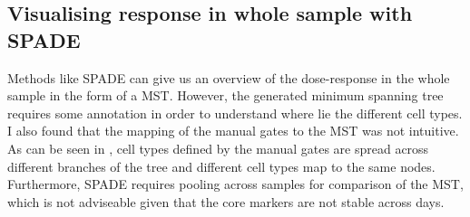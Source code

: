\subsection{Visualising response in whole sample with SPADE}

Methods like SPADE can give us an overview of the dose-response in the whole sample in the form of a \gls{MST}.
However, the generated minimum spanning tree requires some annotation in order to understand where lie the different cell types.
I also found that the mapping of the manual gates to the MST was not intuitive.
As can be seen in , cell types defined by the manual gates are spread across different branches of the tree
and different cell types map to the same nodes.
Furthermore, SPADE requires pooling across samples for comparison of the \gls{MST}, which is not adviseable given that the core
markers are not stable across days.

